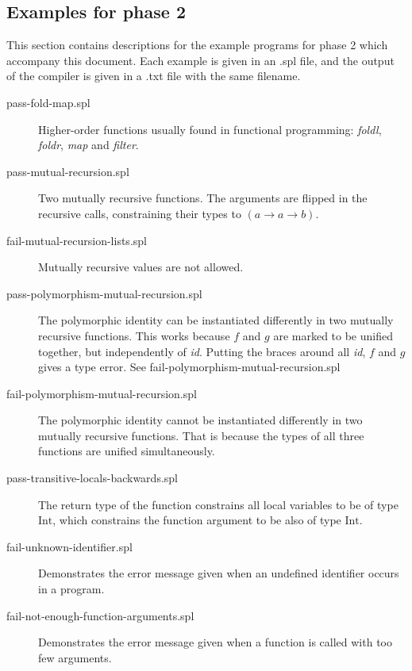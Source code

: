 \documentclass[a4paper]{article}
\newcommand{\arr}{\rightarrow}
\begin{document}
\subsection{Examples for phase 2}

This section contains descriptions for the example programs for phase 2 which
accompany this document.  Each example is given in an .spl file, and the output
of the compiler is given in a .txt file with the same filename.

\begin{description}

  \item[pass-fold-map.spl] Higher-order functions usually found in functional
  programming: \emph{foldl}, \emph{foldr}, \emph{map} and \emph{filter}.

  \item[pass-mutual-recursion.spl] Two mutually recursive functions. The
  arguments are flipped in the recursive calls, constraining their types to $(a
  \arr a \arr b)$.

  \item[fail-mutual-recursion-lists.spl] Mutually recursive values are not
  allowed.

  \item[pass-polymorphism-mutual-recursion.spl] The polymorphic identity can be
  instantiated differently in two mutually recursive functions.  This works
  because $f$ and $g$ are marked to be unified together, but independently of
  \emph{id}.  Putting the braces around all \emph{id}, $f$ and $g$ gives a type
  error.  See fail-polymorphism-mutual-recursion.spl

  \item[fail-polymorphism-mutual-recursion.spl] The polymorphic identity cannot
  be instantiated differently in two mutually recursive functions.  That is
  because the types of all three functions are unified simultaneously.

  \item[pass-transitive-locals-backwards.spl] The return type of the function
  constrains all local variables to be of type $\text{Int}$, which constrains
  the function argument to be also of type $\text{Int}$.

  \item[fail-unknown-identifier.spl] Demonstrates the error message given when
  an undefined identifier occurs in a program.

  \item[fail-not-enough-function-arguments.spl] Demonstrates the error message
  given when a function is called with too few arguments.


\end{description}
\end{document}
